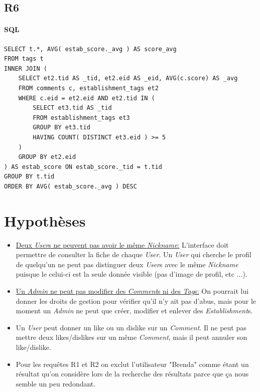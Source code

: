 \documentclass[11pt,a4paper]{report}
\begin{document}
\subsection*{R6}


\paragraph*{SQL}
\begin{verbatim}
SELECT t.*, AVG( estab_score._avg ) AS score_avg
FROM tags t
INNER JOIN (
    SELECT et2.tid AS _tid, et2.eid AS _eid, AVG(c.score) AS _avg
    FROM comments c, establishment_tags et2
    WHERE c.eid = et2.eid AND et2.tid IN (
        SELECT et3.tid AS _tid
        FROM establishment_tags et3
        GROUP BY et3.tid
        HAVING COUNT( DISTINCT et3.eid ) >= 5
    )
    GROUP BY et2.eid
) AS estab_score ON estab_score._tid = t.tid
GROUP BY t.tid 
ORDER BY AVG( estab_score._avg ) DESC
\end{verbatim}

\section*{Hypothèses}
\noindent

\begin{itemize}
\item \underline{Deux \textit{User}s ne peuvent pas avoir le même \textit{Nickname}:} L'interface doit permettre de consulter la fiche de chaque \textit{User}. Un \textit{User} qui cherche le profil de quelqu'un ne peut pas distinguer deux \textit{User}s avec le même \textit{Nickname} puisque le celui-ci est la seule donnée visible (pas d'image de profil, etc ...).
\item \underline{Un \textit{Admin} ne peut pas modifier des \textit{Comment}s ni des \textit{Tag}s:} On pourrait lui donner les droits de gestion pour vérifier qu'il n'y ait pas d'abus, mais pour le moment un \textit{Admin} ne peut que créer, modifier et enlever des \textit{Establishment}s.
\item Un \textit{User} peut donner un like ou un dislike sur un \textit{Comment}. Il ne peut pas mettre deux likes/dislikes sur un même \textit{Comment}, mais il peut annuler son like/dislike.
\item Pour les requêtes R1 et R2 on exclut l'utilisateur "Brenda" comme étant un résultat qu'on considère lors de la recherche des résultats parce que ça nous semble un peu redondant.
\end{itemize}
\end{document}
